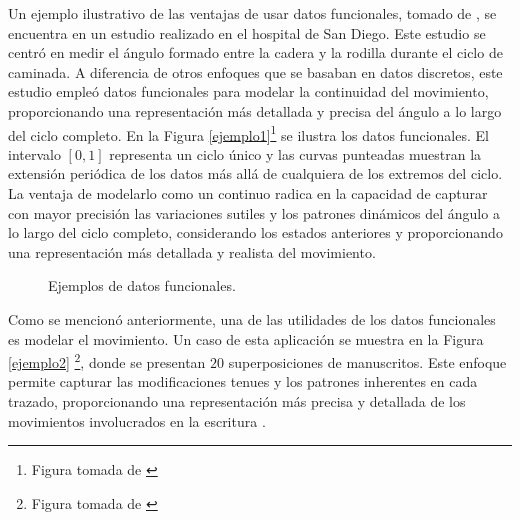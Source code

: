 Un ejemplo ilustrativo de las ventajas de usar datos funcionales, tomado de \cite[Pág. 6]{Ramsay2009}, se encuentra en un estudio realizado en el hospital de San Diego. Este estudio se centró en medir el ángulo formado entre la cadera y la rodilla durante el ciclo de caminada. A diferencia de otros enfoques que se basaban en datos discretos, este estudio empleó datos funcionales para modelar la continuidad del movimiento, proporcionando una representación más detallada y precisa del ángulo a lo largo del ciclo completo. En la Figura \ref{ejemplo1}\footnote{Figura tomada de \cite{Ramsay2009}} se ilustra los datos funcionales. El intervalo $[0,1]$ representa un ciclo único y las curvas punteadas muestran la extensión periódica de los datos más allá de cualquiera de los extremos del ciclo. La ventaja de modelarlo como un continuo radica en la capacidad de capturar con mayor precisión las variaciones sutiles y los patrones dinámicos del ángulo a lo largo del ciclo completo, considerando los estados anteriores y proporcionando una representación más detallada y realista del movimiento.

\begin{figure}[H]
 \centering
    \caption{Ejemplos de datos funcionales.}
    \label{fig:fdaEjemplo}
\end{figure}

Como se mencionó anteriormente, una de las utilidades de los datos funcionales es modelar el movimiento. Un caso de esta aplicación se muestra en la Figura \ref{ejemplo2} \footnote{Figura tomada de \cite{Ramsay2009}}, donde se presentan $20$ superposiciones de manuscritos. Este enfoque permite capturar las modificaciones tenues y los patrones inherentes en cada trazado, proporcionando una representación más precisa y detallada de los movimientos involucrados en la escritura \cite[Pág. 8]{Ramsay2009}.

